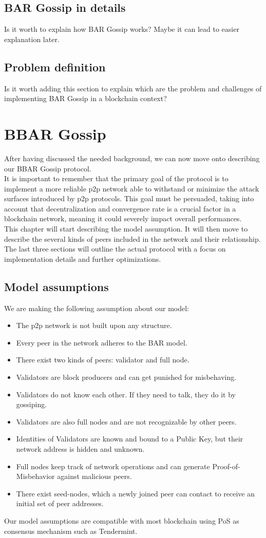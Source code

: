 \documentclass[mscthesis]{usiinfthesis}
\begin{document}
\section{BAR Gossip in details}
Is it worth to explain how BAR Gossip works? Maybe it can lead to easier explanation later.
\section{Problem definition}
Is it worth adding this section to explain which are the problem and challenges of implementing BAR Gossip in a blockchain context?


\chapter{BBAR Gossip}
After having discussed the needed background, we can now move onto describing our BBAR Gossip protocol.\\
 It is important to remember that the primary goal of the protocol is to implement a more reliable p2p network able to withstand or minimize the attack surfaces introduced by p2p protocols. This goal must be persuaded, taking into account that decentralization and convergence rate is a crucial factor in a blockchain network, meaning it could severely impact overall performances.\\
This chapter will start describing the model assumption. It will then move to describe the several kinds of peers included in the network and their relationship. The last three sections will outline the actual protocol with a focus on implementation details and further optimizations.
\section{Model assumptions}
We are making the following assumption about our model:
\begin{itemize}
	\item The p2p network is not built upon any structure.
	\item Every peer in the network adheres to the BAR model.
	\item There exist two kinds of peers: validator and full node.
	\item Validators are block producers and can get punished for misbehaving.
	\item Validators do not know each other. If they need to talk, they do it by gossiping.
	\item Validators are also full nodes and are not recognizable by other peers.
	\item Identities of Validators are known and bound to a Public Key, but their network address is hidden and unknown.
	\item Full nodes keep track of network operations and can generate Proof-of-Misbehavior against malicious peers.
	\item There exist seed-nodes, which a newly joined peer can contact to receive an initial set of peer addresses.
\end{itemize}
Our model assumptions are compatible with most blockchain using PoS as consensus mechanism such as Tendermint.
\end{document}
